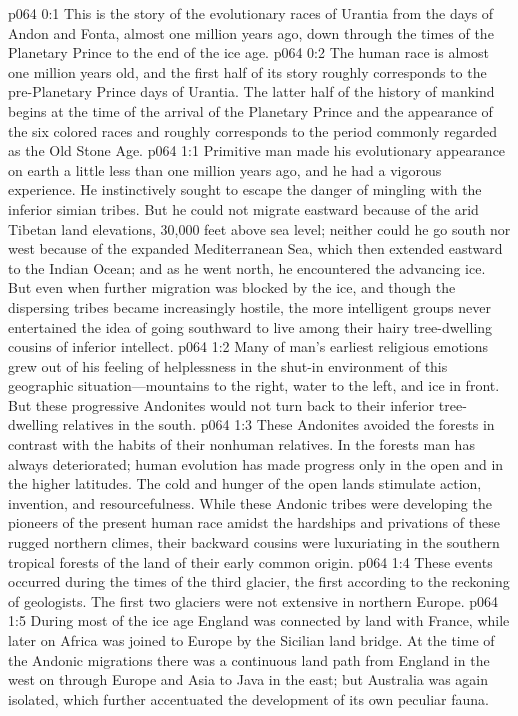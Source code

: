 \author{Life Carrier}
\vs p064 0:1 This is the story of the evolutionary races of Urantia from the days of Andon and Fonta, almost one million years ago, down through the times of the Planetary Prince to the end of the ice age.
\vs p064 0:2 The human race is almost one million years old, and the first half of its story roughly corresponds to the pre\hyp{}Planetary Prince days of Urantia. The latter half of the history of mankind begins at the time of the arrival of the Planetary Prince and the appearance of the six colored races and roughly corresponds to the period commonly regarded as the Old Stone Age.
\vs p064 1:1 Primitive man made his evolutionary appearance on earth a little less than one million years ago, and he had a vigorous experience. He instinctively sought to escape the danger of mingling with the inferior simian tribes. But he could not migrate eastward because of the arid Tibetan land elevations, 30,000 feet above sea level; neither could he go south nor west because of the expanded Mediterranean Sea, which then extended eastward to the Indian Ocean; and as he went north, he encountered the advancing ice. But even when further migration was blocked by the ice, and though the dispersing tribes became increasingly hostile, the more intelligent groups never entertained the idea of going southward to live among their hairy tree\hyp{}dwelling cousins of inferior intellect.
\vs p064 1:2 Many of man’s earliest religious emotions grew out of his feeling of helplessness in the shut\hyp{}in environment of this geographic situation---mountains to the right, water to the left, and ice in front. But these progressive Andonites would not turn back to their inferior tree\hyp{}dwelling relatives in the south.
\vs p064 1:3 These Andonites avoided the forests in contrast with the habits of their nonhuman relatives. In the forests man has always deteriorated; human evolution has made progress only in the open and in the higher latitudes. The cold and hunger of the open lands stimulate action, invention, and resourcefulness. While these Andonic tribes were developing the pioneers of the present human race amidst the hardships and privations of these rugged northern climes, their backward cousins were luxuriating in the southern tropical forests of the land of their early common origin.
\pc \vs p064 1:4 These events occurred during the times of the third glacier, the first according to the reckoning of geologists. The first two glaciers were not extensive in northern Europe.
\vs p064 1:5 During most of the ice age England was connected by land with France, while later on Africa was joined to Europe by the Sicilian land bridge. At the time of the Andonic migrations there was a continuous land path from England in the west on through Europe and Asia to Java in the east; but Australia was again isolated, which further accentuated the development of its own peculiar fauna.
